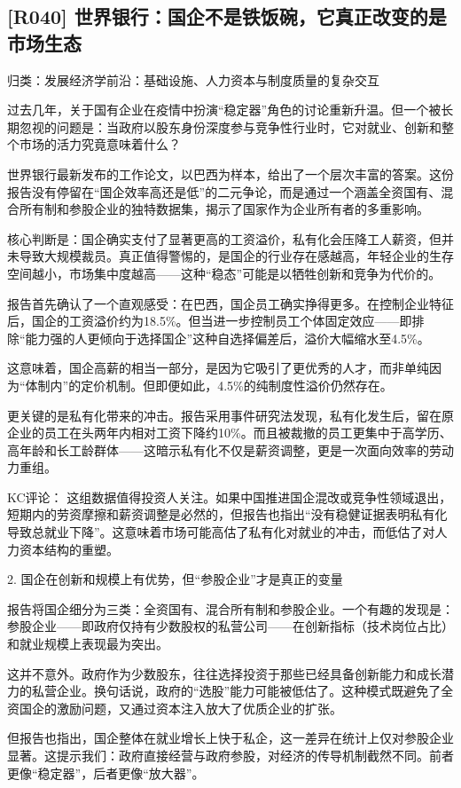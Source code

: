 \documentclass[11pt]{ctexart}
\begin{document}
\subsection{[R040] 世界银行：国企不是铁饭碗，它真正改变的是市场生态}
{\small\color{refgray}归类：发展经济学前沿：基础设施、人力资本与制度质量的复杂交互}

过去几年，关于国有企业在疫情中扮演“稳定器”角色的讨论重新升温。但一个被长期忽视的问题是：当政府以股东身份深度参与竞争性行业时，它对就业、创新和整个市场的活力究竟意味着什么？

世界银行最新发布的工作论文，以巴西为样本，给出了一个层次丰富的答案。这份报告没有停留在“国企效率高还是低”的二元争论，而是通过一个涵盖全资国有、混合所有制和参股企业的独特数据集，揭示了国家作为企业所有者的多重影响。

核心判断是：国企确实支付了显著更高的工资溢价，私有化会压降工人薪资，但并未导致大规模裁员。真正值得警惕的，是国企的行业存在感越高，年轻企业的生存空间越小，市场集中度越高——这种“稳态”可能是以牺牲创新和竞争为代价的。

报告首先确认了一个直观感受：在巴西，国企员工确实挣得更多。在控制企业特征后，国企的工资溢价约为18.5\%。但当进一步控制员工个体固定效应——即排除“能力强的人更倾向于选择国企”这种自选择偏差后，溢价大幅缩水至4.5\%。

这意味着，国企高薪的相当一部分，是因为它吸引了更优秀的人才，而非单纯因为“体制内”的定价机制。但即便如此，4.5\%的纯制度性溢价仍然存在。

更关键的是私有化带来的冲击。报告采用事件研究法发现，私有化发生后，留在原企业的员工在头两年内相对工资下降约10\%。而且被裁撤的员工更集中于高学历、高年龄和长工龄群体——这暗示私有化不仅是薪资调整，更是一次面向效率的劳动力重组。

KC评论： 这组数据值得投资人关注。如果中国推进国企混改或竞争性领域退出，短期内的劳资摩擦和薪资调整是必然的，但报告也指出“没有稳健证据表明私有化导致总就业下降”。这意味着市场可能高估了私有化对就业的冲击，而低估了对人力资本结构的重塑。

2. 国企在创新和规模上有优势，但“参股企业”才是真正的变量

报告将国企细分为三类：全资国有、混合所有制和参股企业。一个有趣的发现是：参股企业——即政府仅持有少数股权的私营公司——在创新指标（技术岗位占比）和就业规模上表现最为突出。

这并不意外。政府作为少数股东，往往选择投资于那些已经具备创新能力和成长潜力的私营企业。换句话说，政府的“选股”能力可能被低估了。这种模式既避免了全资国企的激励问题，又通过资本注入放大了优质企业的扩张。

但报告也指出，国企整体在就业增长上快于私企，这一差异在统计上仅对参股企业显著。这提示我们：政府直接经营与政府参股，对经济的传导机制截然不同。前者更像“稳定器”，后者更像“放大器”。
\end{document}
